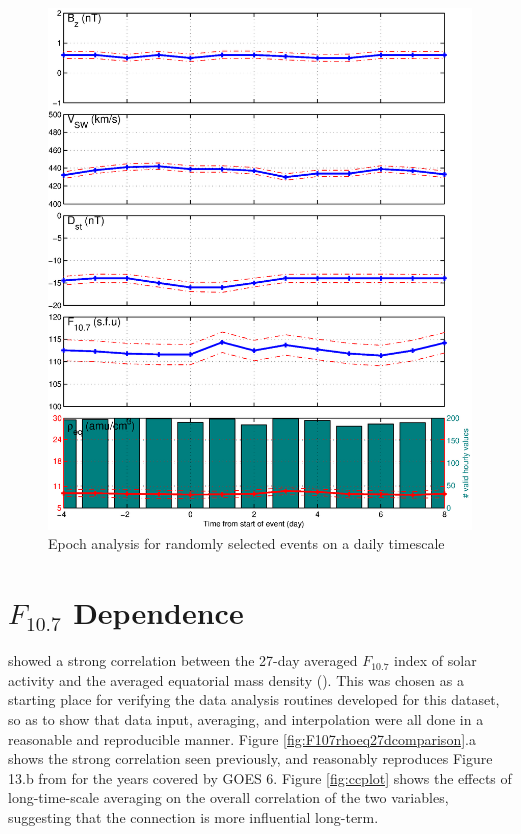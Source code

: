 \begin{figure}[htp!]
	\centering
	\includegraphics[width=1\linewidth]{Figures/StormAvs/stormavs-randomdaily-GOES6}
	\caption{Epoch analysis for randomly selected events on a daily timescale}
	\label{fig:EpochRandomDaily}
\end{figure}



\section{$F_{10.7}$ Dependence}
\cite{Takahashi2010SolarCycleVariation} showed a strong correlation between the 27-day averaged $F_{10.7}$ index of solar activity and the averaged equatorial mass density (\req). This was chosen as a starting place for verifying the data analysis routines developed for this dataset, so as to show that data input, averaging, and interpolation were all done in a reasonable and reproducible manner. Figure \ref{fig:F107rhoeq27dcomparison}.a shows the strong correlation seen previously, and reasonably reproduces Figure 13.b from \cite{Takahashi2010SolarCycleVariation} for the years covered by GOES 6. Figure \ref{fig:ccplot} shows the effects of long-time-scale averaging on the overall correlation of the two variables, suggesting that the connection is more influential long-term.

